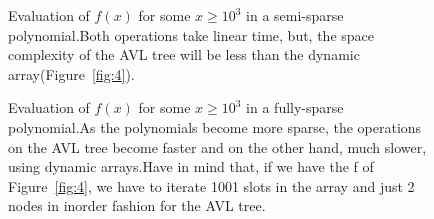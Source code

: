 \documentclass[journal,article,submit,moreauthors,algorithms]{Definitions/mdpi}
\begin{document}
\begin{figure}[H] 
\centering
{}
\hfil
{}
\caption{Evaluation of $f(x)$ for some $x \geq 10^3$ in a semi-sparse polynomial.Both operations take linear time, but, the space complexity of the AVL tree will be less than the dynamic array(Figure~\ref{fig:4}).}
\label{fig:8}
\end{figure}



\begin{figure}[H] 
\centering
{}
\hfil
{}
\caption{Evaluation of $f(x)$ for some $x \geq 10^3$ in a fully-sparse polynomial.As the polynomials become more sparse, the operations on the AVL tree become faster and on the other hand, much slower, using dynamic arrays.Have in mind that, if we have the f of Figure~\ref{fig:4}, we have to iterate 1001 slots in the array and just 2 nodes in inorder fashion for the AVL tree.}
\label{fig:9}
\end{figure}
\end{document}
